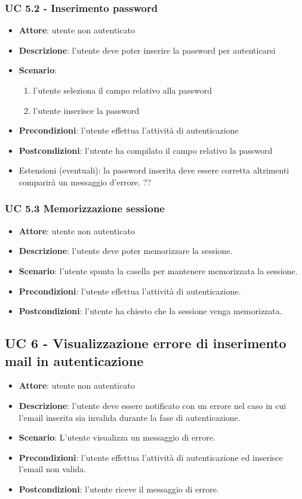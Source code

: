 \subsubsection{UC 5.2 - Inserimento password}
\begin{itemize}
    \item \textbf{Attore}: utente non autenticato
    \item \textbf{Descrizione}: l’utente deve poter inserire la password per autenticarsi
    \item \textbf{Scenario}: 
    \begin{enumerate} 
        \item l’utente seleziona il campo relativo alla password
        \item l’utente inserisce la password
    \end{enumerate}
    \item \textbf{Precondizioni}: l’utente effettua l’attività di autenticazione
    \item \textbf{Postcondizioni}: l’utente ha compilato il campo relativo la password
    \item Estensioni (eventuali): la password inserita deve essere corretta altrimenti comparirà un messaggio d’errore. ??
\end{itemize}

\subsubsection{UC 5.3 Memorizzazione sessione}
\begin{itemize}
    \item \textbf{Attore}: utente non autenticato
    \item \textbf{Descrizione}: l’utente deve poter memorizzare la sessione.
    \item \textbf{Scenario}: l’utente spunta la casella per mantenere memorizzata la sessione.
    \item \textbf{Precondizioni}: l’utente effettua l’attività di autenticazione.
    \item \textbf{Postcondizioni}: l’utente ha chiesto che la sessione venga memorizzata.
\end{itemize}

\subsection{UC 6 - Visualizzazione errore di inserimento mail in autenticazione}
\begin{itemize}
    \item \textbf{Attore}: utente non autenticato
    \item \textbf{Descrizione}: l’utente deve essere notificato con un errore nel caso in cui l’email inserita sia invalida durante la fase di autenticazione.
    \item \textbf{Scenario}: L’utente visualizza un messaggio di errore. 
    \item \textbf{Precondizioni}: l’utente effettua l’attività di autenticazione ed inserisce l’email non valida.
    \item \textbf{Postcondizioni}: l’utente riceve il messaggio di errore.
\end{itemize}

